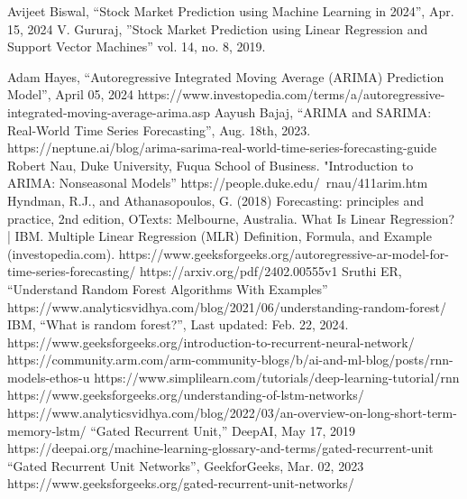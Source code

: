 \documentclass{ieeeojies}
\begin{document}
\begin{thebibliography}{00}
 Avijeet Biswal, “Stock Market Prediction using Machine Learning in 2024”, Apr. 15, 2024
 V. Gururaj, ”Stock Market Prediction using Linear Regression and Support Vector Machines” vol. 14, no. 8, 2019.

 Adam Hayes, “Autoregressive Integrated Moving Average (ARIMA) Prediction Model”, April 05, 2024
https://www.investopedia.com/terms/a/autoregressive-integrated-moving-average-arima.asp
 Aayush Bajaj, “ARIMA and SARIMA: Real-World Time Series Forecasting”, Aug. 18th, 2023.
https://neptune.ai/blog/arima-sarima-real-world-time-series-forecasting-guide
 Robert Nau, Duke University, Fuqua School of Business. "Introduction to ARIMA: Nonseasonal Models”
https://people.duke.edu/~rnau/411arim.htm
 Hyndman, R.J., and Athanasopoulos, G. (2018) Forecasting: principles and practice, 2nd edition, OTexts: Melbourne, Australia. 
 What Is Linear Regression? | IBM.
 Multiple Linear Regression (MLR) Definition, Formula, and Example (investopedia.com).
 https://www.geeksforgeeks.org/autoregressive-ar-model-for-time-series-forecasting/
https://arxiv.org/pdf/2402.00555v1
 Sruthi ER, “Understand Random Forest Algorithms With Examples”
https://www.analyticsvidhya.com/blog/2021/06/understanding-random-forest/
 IBM, “What is random forest?”, Last updated: Feb. 22, 2024.
 https://www.geeksforgeeks.org/introduction-to-recurrent-neural-network/
 https://community.arm.com/arm-community-blogs/b/ai-and-ml-blog/posts/rnn-models-ethos-u
  https://www.simplilearn.com/tutorials/deep-learning-tutorial/rnn
https://www.geeksforgeeks.org/understanding-of-lstm-networks/
https://www.analyticsvidhya.com/blog/2022/03/an-overview-on-long-short-term-memory-lstm/
“Gated Recurrent Unit,” DeepAI, May 17, 2019 https://deepai.org/machine-learning-glossary-and-terms/gated-recurrent-unit
“Gated Recurrent Unit Networks”, GeekforGeeks, Mar. 02, 2023 https://www.geeksforgeeks.org/gated-recurrent-unit-networks/
\end{thebibliography}


\EOD
\end{document}
